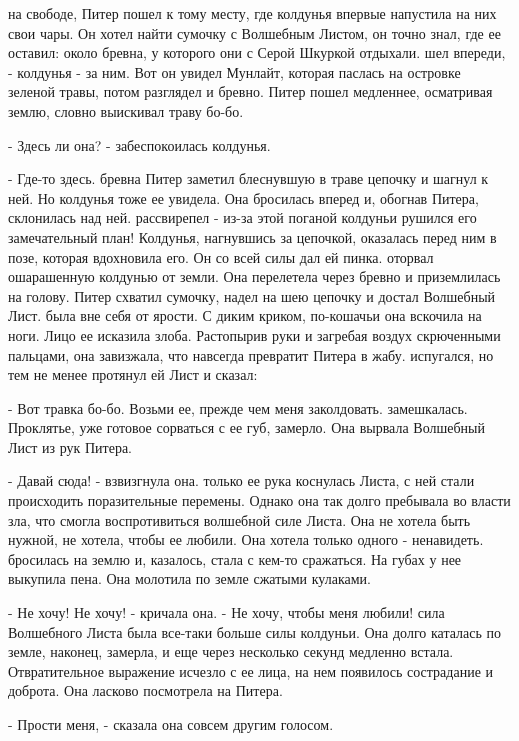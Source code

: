  на свободе, Питер пошел к тому месту, где колдунья 
впервые напустила на них свои чары. Он хотел найти сумочку с Волшебным 
Листом, он точно знал, где ее оставил: около бревна, у которого они с 
Серой Шкуркой отдыхали.
 шел впереди, - колдунья - за ним. Вот он увидел Мунлайт, 
которая паслась на островке зеленой травы, потом разглядел и бревно. 
Питер пошел медленнее, осматривая землю, словно выискивал траву бо-бо.
\par- Здесь ли она? - забеспокоилась колдунья.
\par- Где-то здесь.
 бревна Питер заметил блеснувшую в траве цепочку и шагнул к 
ней. Но колдунья тоже ее увидела. Она бросилась вперед и, обогнав 
Питера, склонилась над ней.
 рассвирепел - из-за этой поганой колдуньи рушился его 
замечательный план! Колдунья, нагнувшись за цепочкой, оказалась перед 
ним в позе, которая вдохновила его. Он со всей силы дал ей пинка.
 оторвал ошарашенную колдунью от земли. Она перелетела через 
бревно и приземлилась на голову. Питер схватил сумочку, надел на шею 
цепочку и достал Волшебный Лист.
 была вне себя от ярости. С диким криком, по-кошачьи она 
вскочила на ноги. Лицо ее исказила злоба. Растопырив руки и загребая 
воздух скрюченными пальцами, она завизжала, что навсегда превратит 
Питера в жабу.
 испугался, но тем не менее протянул ей Лист и сказал:
\par- Вот травка бо-бо. Возьми ее, прежде чем меня заколдовать.
 замешкалась. Проклятье, уже готовое сорваться с ее губ, 
замерло. Она вырвала Волшебный Лист из рук Питера.
\par- Давай сюда! - взвизгнула она.
 только ее рука коснулась Листа, с ней стали происходить 
поразительные перемены. Однако она так долго пребывала во власти зла, 
что смогла воспротивиться волшебной силе Листа. Она не хотела быть 
нужной, не хотела, чтобы ее любили. Она хотела только одного - 
ненавидеть.
 бросилась на землю и, казалось, стала с кем-то сражаться. 
На губах у нее выкупила пена. Она молотила по земле сжатыми кулаками.
\par- Не хочу! Не хочу! - кричала она. - Не хочу, чтобы меня любили!
 сила Волшебного Листа была все-таки больше силы колдуньи. Она 
долго каталась по земле, наконец, замерла, и еще через несколько 
секунд медленно встала. Отвратительное выражение исчезло с ее лица, на 
нем появилось сострадание и доброта. Она ласково посмотрела на Питера.
\par- Прости меня, - сказала она совсем другим голосом.
